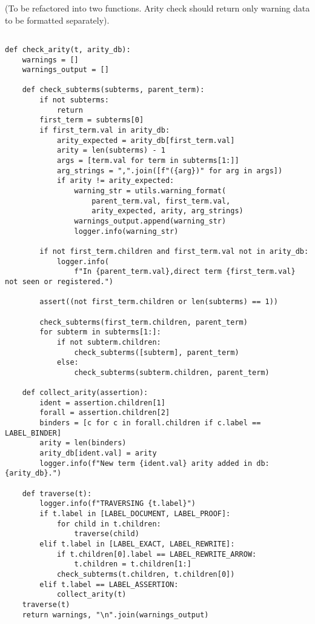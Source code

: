 (To be refactored into two functions. Arity check should return only warning data to be formatted separately).

\begin{lstlisting}

def check_arity(t, arity_db):
    warnings = []
    warnings_output = []

    def check_subterms(subterms, parent_term):
        if not subterms:
            return
        first_term = subterms[0]
        if first_term.val in arity_db:
            arity_expected = arity_db[first_term.val]
            arity = len(subterms) - 1
            args = [term.val for term in subterms[1:]]
            arg_strings = ",".join([f"({arg})" for arg in args])
            if arity != arity_expected:
                warning_str = utils.warning_format(
                    parent_term.val, first_term.val,
                    arity_expected, arity, arg_strings)
                warnings_output.append(warning_str)
                logger.info(warning_str)

        if not first_term.children and first_term.val not in arity_db:
            logger.info(
                f"In {parent_term.val},direct term {first_term.val} not seen or registered.")

        assert((not first_term.children or len(subterms) == 1))

        check_subterms(first_term.children, parent_term)
        for subterm in subterms[1:]:
            if not subterm.children:
                check_subterms([subterm], parent_term)
            else:
                check_subterms(subterm.children, parent_term)

    def collect_arity(assertion):
        ident = assertion.children[1]
        forall = assertion.children[2]
        binders = [c for c in forall.children if c.label == LABEL_BINDER]
        arity = len(binders)
        arity_db[ident.val] = arity
        logger.info(f"New term {ident.val} arity added in db: {arity_db}.")

    def traverse(t):
        logger.info(f"TRAVERSING {t.label}")
        if t.label in [LABEL_DOCUMENT, LABEL_PROOF]:
            for child in t.children:
                traverse(child)
        elif t.label in [LABEL_EXACT, LABEL_REWRITE]:
            if t.children[0].label == LABEL_REWRITE_ARROW:
                t.children = t.children[1:]
            check_subterms(t.children, t.children[0])
        elif t.label == LABEL_ASSERTION:
            collect_arity(t)
    traverse(t)
    return warnings, "\n".join(warnings_output)
\end{lstlisting}


